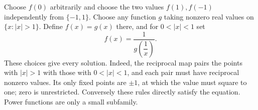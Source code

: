 Choose $f(0)$ arbitrarily and choose the two values $f(1),f(-1)$ independently from $\{-1,1\}$. Choose any function $g$ taking nonzero real values on $\{x:|x|>1\}$. Define $f(x)=g(x)$ there, and for $0<|x|<1$ set
\[
f(x)=\dfrac{1}{g(\dfrac{1}{x})}.
\]
These choices give every solution. Indeed, the reciprocal map pairs the points with $|x|>1$ with those with $0<|x|<1$, and each pair must have reciprocal nonzero values. Its only fixed points are $\pm1$, at which the value must square to one; zero is unrestricted. Conversely these rules directly satisfy the equation. Power functions are only a small subfamily.

